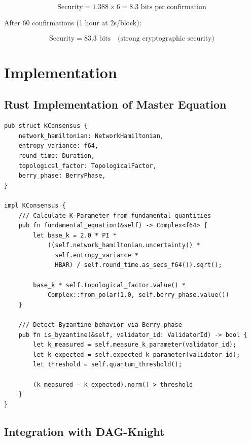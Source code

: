 \documentclass[11pt,a4paper,twoside]{article}
\begin{document}
\begin{equation}
\text{Security} = 1.388 \times 6 = 8.3 \text{ bits per confirmation}
\end{equation}

After 60 confirmations (1 hour at 2s/block):

\begin{equation}
\text{Security} = 83.3 \text{ bits} \quad \text{(strong cryptographic security)}
\end{equation}

\newpage

\section{Implementation}

\subsection{Rust Implementation of Master Equation}

\begin{verbatim}
pub struct KConsensus {
    network_hamiltonian: NetworkHamiltonian,
    entropy_variance: f64,
    round_time: Duration,
    topological_factor: TopologicalFactor,
    berry_phase: BerryPhase,
}

impl KConsensus {
    /// Calculate K-Parameter from fundamental quantities
    pub fn fundamental_equation(&self) -> Complex<f64> {
        let base_k = 2.0 * PI *
            ((self.network_hamiltonian.uncertainty() *
              self.entropy_variance *
              HBAR) / self.round_time.as_secs_f64()).sqrt();

        base_k * self.topological_factor.value() *
            Complex::from_polar(1.0, self.berry_phase.value())
    }

    /// Detect Byzantine behavior via Berry phase
    pub fn is_byzantine(&self, validator_id: ValidatorId) -> bool {
        let k_measured = self.measure_k_parameter(validator_id);
        let k_expected = self.expected_k_parameter(validator_id);
        let threshold = self.quantum_threshold();

        (k_measured - k_expected).norm() > threshold
    }
}
\end{verbatim}

\subsection{Integration with DAG-Knight}
\end{document}
